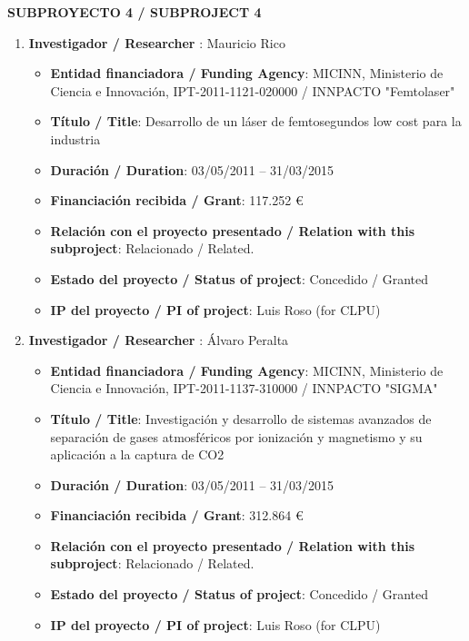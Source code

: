 \vspace{12pt}

\noindent\textbf{SUBPROYECTO 4 / SUBPROJECT 4}

\begin{enumerate}

\item {\bf Investigador / Researcher }: Mauricio Rico
\begin{itemize}
	\item {\bf Entidad financiadora / Funding Agency}: MICINN, Ministerio de Ciencia e Innovaci\'on, IPT-2011-1121-020000 / INNPACTO "Femtolaser"
	\item {\bf Título / Title}:  Desarrollo de un l\'aser de femtosegundos low cost para la industria
	\item {\bf Duración / Duration}:  03/05/2011 -- 31/03/2015
	\item {\bf Financiación recibida / Grant}: 117.252 \euro 
	\item {\bf Relación con el proyecto presentado / Relation with this subproject}: Relacionado / Related. 
	\item {\bf Estado del proyecto / Status of project}: Concedido / Granted
	\item {\bf IP del proyecto / PI of project}: Luis Roso (for CLPU)
\end{itemize}

\item {\bf Investigador / Researcher }: \'Alvaro Peralta
\begin{itemize}
	\item {\bf Entidad financiadora / Funding Agency}: MICINN, Ministerio de Ciencia e Innovaci\'on, IPT-2011-1137-310000  / INNPACTO "SIGMA"
	\item {\bf Título / Title}: Investigaci\'on y desarrollo de sistemas avanzados de separaci\'on de gases atmosf\'ericos por ionizaci\'on y magnetismo y su aplicaci\'on a la captura de CO2
	\item {\bf Duración / Duration}: 03/05/2011 -- 31/03/2015
	\item {\bf Financiación recibida / Grant}: 312.864 \euro 
	\item {\bf Relación con el proyecto presentado / Relation with this subproject}: Relacionado / Related. 
	\item {\bf Estado del proyecto / Status of project}: Concedido / Granted
	\item {\bf IP del proyecto / PI of project}: Luis Roso (for CLPU)
\end{itemize}


\end{enumerate}
